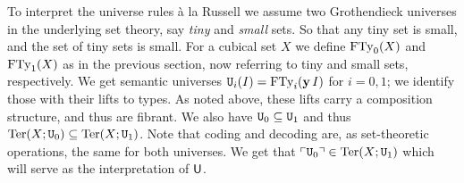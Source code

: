 To interpret the universe rules \`a la Russell we assume two
Grothendieck universes in the underlying set theory, say \emph{tiny}
and \emph{small} sets.  So that any tiny set is small, and the set of tiny
sets is small.  For a cubical set $X$ we define $\operatorname{FTy}_0 (X)$ and
$\operatorname{FTy}_1 (X)$ as in the previous section, now referring to tiny and
small sets, respectively.  We get semantic universes $\mathtt{U}_i (I) =
\operatorname{FTy}_i (\operatorname{\mathbf{y}} I)$ for $i=0,1$; we identify those with their lifts to
types.  As noted above, these lifts carry a composition structure, and
thus are fibrant.  We also have $\mathtt{U}_0 \subseteq \mathtt{U}_1$ and thus $\operatorname{Ter}
(X;\mathtt{U}_0) \subseteq \operatorname{Ter} (X;\mathtt{U}_1)$.  Note that coding and decoding
are, as set-theoretic operations, the same for both universes.  We get
that $\ulcorner \mathtt{U}_0 \urcorner \in \operatorname{Ter} (X;\mathtt{U}_1)$ which will serve as the
interpretation of $\mathsf{U}$.


